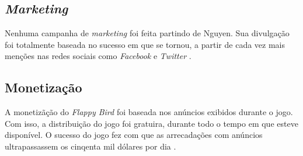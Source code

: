 \subsection{\textit{Marketing}}
Nenhuma campanha de \textit{marketing} foi feita partindo de Nguyen. Sua divulgação foi totalmente baseada no sucesso em que se tornou, a partir de cada vez mais menções nas redes sociais como \textit{Facebook} e \textit{Twitter} \cite{Eldic2014}.

\subsection{Monetização}
A monetizãção do \textit{Flappy Bird} foi baseada nos anúncios exibidos durante o jogo. Com isso, a distribuição do jogo foi gratuira, durante todo o tempo em que esteve disponível. O sucesso do jogo fez com que as arrecadações com anúncios ultrapassassem os cinqenta mil dólares por dia \cite{Eldic2014}.